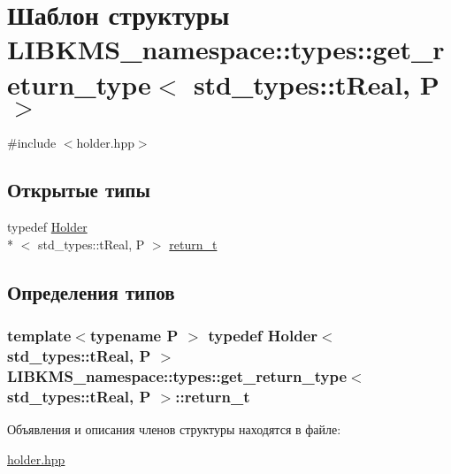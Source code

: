 \hypertarget{structLIBKMS__namespace_1_1types_1_1get__return__type_3_01std__types_1_1tReal_00_01P_01_4}{\section{Шаблон структуры L\-I\-B\-K\-M\-S\-\_\-namespace\-:\-:types\-:\-:get\-\_\-return\-\_\-type$<$ std\-\_\-types\-:\-:t\-Real, P $>$}
\label{structLIBKMS__namespace_1_1types_1_1get__return__type_3_01std__types_1_1tReal_00_01P_01_4}
}


{\ttfamily \#include $<$holder.\-hpp$>$}

\subsection*{Открытые типы}
\begin{DoxyCompactItemize}
\item 
typedef \hyperlink{classLIBKMS__namespace_1_1Holder}{Holder}\\*
$<$ std\-\_\-types\-::t\-Real, P $>$ \hyperlink{structLIBKMS__namespace_1_1types_1_1get__return__type_3_01std__types_1_1tReal_00_01P_01_4_a9c11b988a958551a1cde6f4362287159}{return\-\_\-t}
\end{DoxyCompactItemize}


\subsection{Определения типов}
\hypertarget{structLIBKMS__namespace_1_1types_1_1get__return__type_3_01std__types_1_1tReal_00_01P_01_4_a9c11b988a958551a1cde6f4362287159}{
\subsubsection[{return\-\_\-t}]{\setlength{\rightskip}{0pt plus 5cm}template$<$typename P $>$ typedef {\bf Holder}$<$ std\-\_\-types\-::t\-Real, P $>$ {\bf L\-I\-B\-K\-M\-S\-\_\-namespace\-::types\-::get\-\_\-return\-\_\-type}$<$ std\-\_\-types\-::t\-Real, P $>$\-::{\bf return\-\_\-t}}}\label{structLIBKMS__namespace_1_1types_1_1get__return__type_3_01std__types_1_1tReal_00_01P_01_4_a9c11b988a958551a1cde6f4362287159}


Объявления и описания членов структуры находятся в файле\-:\begin{DoxyCompactItemize}
\item 
\hyperlink{holder_8hpp}{holder.\-hpp}\end{DoxyCompactItemize}
